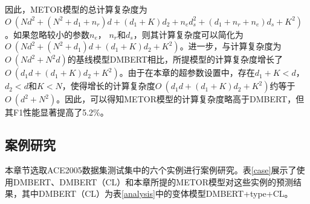 因此，METOR模型的总计算复杂度为$O~(N d^{2}+(N^{2}+d_{1}+n_{r})d+(d_{1}+K)d_{2}+n_{e}d_{s}^2+(d_{1}+n_{r}+n_{e})d_{s}+K^2)$。如果忽略较小的参数$n_{e}$， $n_{r}$和$d_{s}$，则其计算复杂度可以简化为$O~(N d^{2}+(N^{2}+d_{1})d+(d_{1}+K)d_{2}+K^2)$。进一步，与计算复杂度为$O~(N d^{2}+N^{2}d)$的基线模型DMBERT相比，所提模型的计算复杂度增长了$O~(d_{1} d+(d_{1}+K) d_{2}+K^2)$。由于在本章的超参数设置中，存在$d_{1}+K<d$，$d_{2}<d$和$K < N$，使得增长的计算复杂度$O~(d_{1} d+(d_{1}+K) d_{2}+K^2)$约等于$O~(d^{2}+N^{2})$。因此，可以得知METOR模型的计算复杂度略高于DMBERT，但其F1性能显著提高了5.2\%。

\subsection{案例研究}
本章节选取ACE2005数据集测试集中的六个实例进行案例研究。表\ref{case}展示了使用DMBERT、DMBERT（CL）和本章所提的METOR模型对这些实例的预测结果，其中DMBERT（CL）为表\ref{analysis}中的变体模型DMBERT+type+CL。


